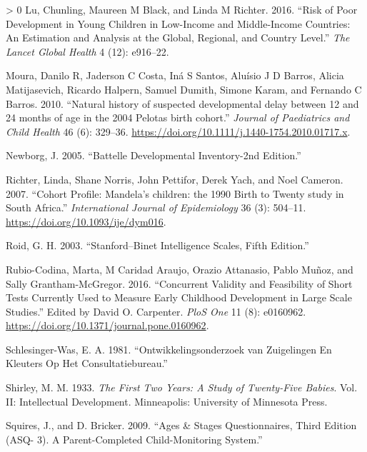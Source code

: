 \documentclass[
]{book}
\newlength{\cslhangindent}
\newenvironment{CSLReferences}[3] %
 {%
  \setlength{\parindent}{0pt}
  \ifodd #1 \everypar{\setlength{\hangindent}{\cslhangindent}}\ignorespaces\fi
  \ifnum #2 > 0
  \setlength{\parskip}{#2\baselineskip}
  \fi
 }%
 {}
\begin{document}
\begin{CSLReferences}{1}{0}
\leavevmode\hypertarget{ref-lu2016}{}%
Lu, Chunling, Maureen M Black, and Linda M Richter. 2016. {``Risk of Poor Development in Young Children in Low-Income and Middle-Income Countries: An Estimation and Analysis at the Global, Regional, and Country Level.''} \emph{The Lancet Global Health} 4 (12): e916--22.

\leavevmode\hypertarget{ref-Moura2010}{}%
Moura, Danilo R, Jaderson C Costa, Iná S Santos, Aluísio J D Barros, Alicia Matijasevich, Ricardo Halpern, Samuel Dumith, Simone Karam, and Fernando C Barros. 2010. {``{Natural history of suspected developmental delay between 12 and 24 months of age in the 2004 Pelotas birth cohort.}''} \emph{Journal of Paediatrics and Child Health} 46 (6): 329--36. \url{https://doi.org/10.1111/j.1440-1754.2010.01717.x}.

\leavevmode\hypertarget{ref-newborg2005}{}%
Newborg, J. 2005. {``Battelle Developmental Inventory-2nd Edition.''}

\leavevmode\hypertarget{ref-Richter2007}{}%
Richter, Linda, Shane Norris, John Pettifor, Derek Yach, and Noel Cameron. 2007. {``{Cohort Profile: Mandela's children: the 1990 Birth to Twenty study in South Africa.}''} \emph{International Journal of Epidemiology} 36 (3): 504--11. \url{https://doi.org/10.1093/ije/dym016}.

\leavevmode\hypertarget{ref-roid2003}{}%
Roid, G. H. 2003. {``Stanford--Binet Intelligence Scales, Fifth Edition.''}

\leavevmode\hypertarget{ref-Rubio-Codina2016}{}%
Rubio-Codina, Marta, M Caridad Araujo, Orazio Attanasio, Pablo Muñoz, and Sally Grantham-McGregor. 2016. {``{Concurrent Validity and Feasibility of Short Tests Currently Used to Measure Early Childhood Development in Large Scale Studies.}''} Edited by David O. Carpenter. \emph{PloS One} 11 (8): e0160962. \url{https://doi.org/10.1371/journal.pone.0160962}.

\leavevmode\hypertarget{ref-schlesinger1981}{}%
Schlesinger-Was, E. A. 1981. {``Ontwikkelingsonderzoek van Zuigelingen En Kleuters Op Het Consultatiebureau.''}

\leavevmode\hypertarget{ref-shirley1933}{}%
Shirley, M. M. 1933. \emph{The First Two Years: A Study of Twenty-Five Babies}. Vol. II: Intellectual Development. Minneapolis: University of Minnesota Press.

\leavevmode\hypertarget{ref-squires2009}{}%
Squires, J., and D. Bricker. 2009. {``Ages \& Stages Questionnaires, Third Edition (ASQ- 3). A Parent-Completed Child-Monitoring System.''}


\end{CSLReferences}
\end{document}
